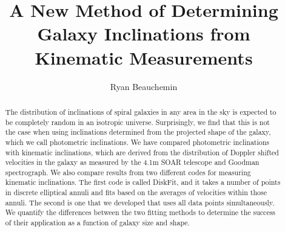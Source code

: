 \documentclass{emulateapj}
\begin{document}

\title{A New Method of Determining Galaxy Inclinations from Kinematic Measurements}


\author{Ryan Beauchemin}






\begin{abstract}
The distribution of inclinations of spiral galaxies in any area in the sky is expected to be completely random in an isotropic universe. Surprisingly, we find that this is not the case when using inclinations determined from the projected shape of the galaxy, which we call photometric inclinations. We have compared photometric inclinations with kinematic inclinations, which are derived from the distribution of Doppler shifted velocities in the galaxy as measured by the 4.1m SOAR telescope and Goodman spectrograph. We also compare results from two different codes for measuring kinematic inclinations. The first code is called DiskFit, and it takes a number of points in discrete elliptical annuli and fits based on the averages of velocities within those annuli. The second is one that we developed that uses all data points simultaneously. We quantify the differences between the two fitting methods to determine the success of their application as a function of galaxy size and shape. 
\end{abstract}
\end{document}
